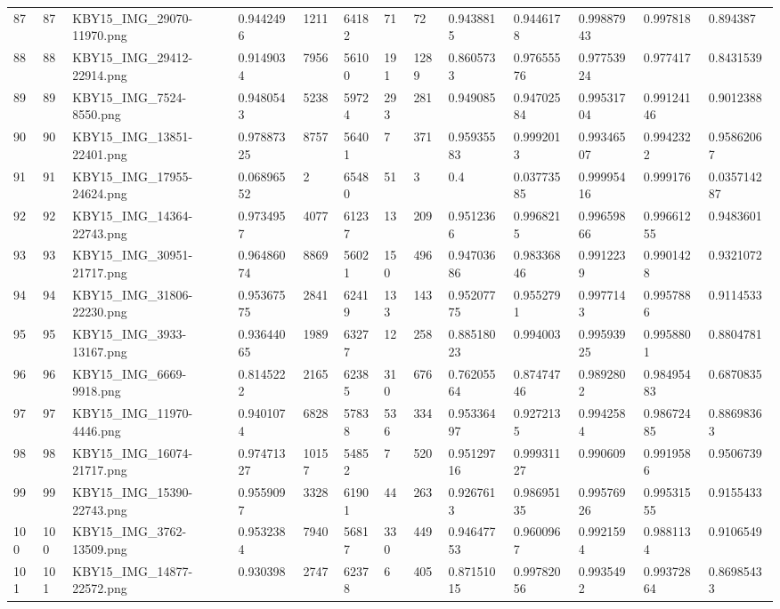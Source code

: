\documentclass[11pt, a4paper, twoside]{report}
\begin{document}
\begin{longtable}[c]{@{}lllllllllllll@{}}
87 & 87 & KBY15\_IMG\_29070-11970.png & 0.9442496 & 1211 & 64182 & 71 & 72 & 0.9438815 & 0.9446178 & 0.99887943 & 0.997818 & 0.894387 \\
88 & 88 & KBY15\_IMG\_29412-22914.png & 0.9149034 & 7956 & 56100 & 191 & 1289 & 0.8605733 & 0.97655576 & 0.97753924 & 0.977417 & 0.8431539 \\
89 & 89 & KBY15\_IMG\_7524-8550.png & 0.9480543 & 5238 & 59724 & 293 & 281 & 0.949085 & 0.94702584 & 0.99531704 & 0.99124146 & 0.9012388 \\
90 & 90 & KBY15\_IMG\_13851-22401.png & 0.97887325 & 8757 & 56401 & 7 & 371 & 0.95935583 & 0.9992013 & 0.99346507 & 0.9942322 & 0.95862067 \\
91 & 91 & KBY15\_IMG\_17955-24624.png & 0.06896552 & 2 & 65480 & 51 & 3 & 0.4 & 0.03773585 & 0.99995416 & 0.999176 & 0.035714287 \\
92 & 92 & KBY15\_IMG\_14364-22743.png & 0.9734957 & 4077 & 61237 & 13 & 209 & 0.9512366 & 0.9968215 & 0.99659866 & 0.99661255 & 0.9483601 \\
93 & 93 & KBY15\_IMG\_30951-21717.png & 0.96486074 & 8869 & 56021 & 150 & 496 & 0.94703686 & 0.98336846 & 0.9912239 & 0.9901428 & 0.9321072 \\
94 & 94 & KBY15\_IMG\_31806-22230.png & 0.95367575 & 2841 & 62419 & 133 & 143 & 0.95207775 & 0.9552791 & 0.9977143 & 0.9957886 & 0.9114533 \\
95 & 95 & KBY15\_IMG\_3933-13167.png & 0.93644065 & 1989 & 63277 & 12 & 258 & 0.88518023 & 0.994003 & 0.99593925 & 0.9958801 & 0.8804781 \\
96 & 96 & KBY15\_IMG\_6669-9918.png & 0.8145222 & 2165 & 62385 & 310 & 676 & 0.76205564 & 0.87474746 & 0.9892802 & 0.98495483 & 0.6870835 \\
97 & 97 & KBY15\_IMG\_11970-4446.png & 0.9401074 & 6828 & 57838 & 536 & 334 & 0.95336497 & 0.9272135 & 0.9942584 & 0.98672485 & 0.88698363 \\
98 & 98 & KBY15\_IMG\_16074-21717.png & 0.97471327 & 10157 & 54852 & 7 & 520 & 0.95129716 & 0.99931127 & 0.990609 & 0.9919586 & 0.9506739 \\
99 & 99 & KBY15\_IMG\_15390-22743.png & 0.9559097 & 3328 & 61901 & 44 & 263 & 0.9267613 & 0.98695135 & 0.99576926 & 0.99531555 & 0.9155433 \\
100 & 100 & KBY15\_IMG\_3762-13509.png & 0.9532384 & 7940 & 56817 & 330 & 449 & 0.94647753 & 0.9600967 & 0.9921594 & 0.9881134 & 0.9106549 \\
101 & 101 & KBY15\_IMG\_14877-22572.png & 0.930398 & 2747 & 62378 & 6 & 405 & 0.87151015 & 0.99782056 & 0.9935492 & 0.99372864 & 0.86985433 \\

\end{longtable}
\end{document}
